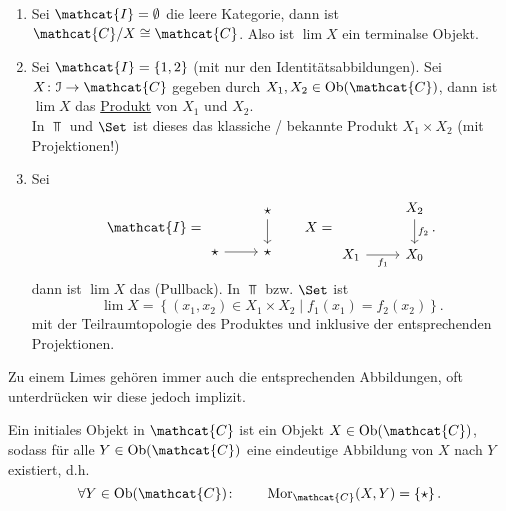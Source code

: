 \begin{example}
    \begin{enumerate}[1)]
        \item Sei $\mathcat{I} = \emptyset$ die leere Kategorie, dann ist $\mathcat{C} / X \cong \mathcat{C}$. Also ist $\lim X$ ein terminalse Objekt.
        \item Sei $\mathcat{I} = \left \{1,2\right\} $ (mit nur den Identitätsabbildungen). Sei $X\colon  \mathcal{I} \to  \mathcat{C}$ gegeben durch $X_1,X_2\in \Ob(\mathcat{C})$, dann ist $\lim X$ das  \underline{Produkt} von $X_1$ und $X_2$. \\
            In $\Top$ und  $\Set$ ist dieses das klassiche / bekannte Produkt  $X_1\times X_2$ (mit Projektionen!)
        \item Sei 
            \[
            \mathcat{I} = 
            \begin{tikzcd}
                & \star \ar{d} \\
                \star \ar{r} & \star 
            \end{tikzcd}
            \qquad
            X = 
            \begin{tikzcd}
                & X_2 \ar{d}{f_2} \\
                X_1 \ar[swap]{r}{f_1} & X_0
            \end{tikzcd}
            .\] 
            dann ist $\lim X$ das   (Pullback). In $\Top$ bzw.  $\Set$ ist
             \[
                 \lim X = \left \{(x_1,x_2) \in  X_1\times X_2 \mid  f_1(x_1) = f_2(x_2)\right\} 
            .\] 
            mit der Teilraumtopologie des Produktes und inklusive der entsprechenden Projektionen.
    \end{enumerate}
\end{example}

\begin{oral}
    Zu einem Limes gehören immer auch die entsprechenden Abbildungen, oft unterdrücken wir diese jedoch implizit.
\end{oral}

\begin{definition}\label{def:initiales-objekt}
    Ein initiales Objekt in $\mathcat{C}$ ist ein Objekt $X\in \Ob(\mathcat{C})$, sodass für alle $Y\in \Ob(\mathcat{C})$ eine eindeutige Abbildung von $X$ nach  $Y$ existiert, d.h.
     \[
         \forall Y\in \Ob(\mathcat{C})\colon  \qquad \Mor_{\mathcat{C}}(X,Y) = \left \{\star\right\} 
    .\] 
\end{definition}

